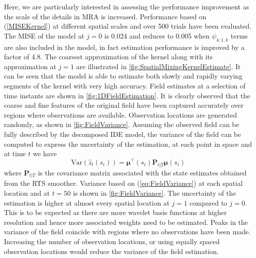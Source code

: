 \documentclass[11pt,draftcls,onecolumn,peerreview]{IEEEtran}
\begin{document}
  Here, we are particularly interested in assessing the performance improvement as the scale of the details in MRA is increased. Performance based on (\ref{MISEKernel}) at different spatial scales and over 500 trials have been evaluated. The MISE of the model at $j=0$ is 0.024 and reduces to 0.005 when $\psi_{4;1,k}$ terms are also included in the model, in fact estimation performance is improved by a factor of 4.8. The coarsest approximation of the kernel along with its approximation at $j=1$ are illustrated in \figurename{\ref{fig:SpatialMixingKernelEstimate}. It can be seen that the model is able to estimate both slowly and rapidly varying segments of the  kernel with very high accuracy.  Field estimates  at a selection of time instants are shown in \figurename{\ref{fig:1DFieldEstimation}}. It is clearly observed that the coarse and fine features of the original field have been captured accurately over regions where observations are available. Observation locations are generated randomly, as shown in \figurename{ \ref{fig:FieldVariance}}. Assuming the observed field can be fully described by the  decomposed IDE model, the variance of the field can be computed to express the  uncertainty of the estimation, at each point in space and at time $t$ we have 
\begin{equation}
 \text{Var}(\hat z_t(s_i))=\boldsymbol\mu^{\top}(s_i) \mathbf P_{t|T}\boldsymbol\mu(s_i)
\label{eq:FieldVariance}
\end{equation}
where $\mathbf P_{t|T} $ is the covariance matrix associated with the  state estimates obtained from the RTS smoother. Variance based on (\ref{eq:FieldVariance}) at each spatial location and at $t=50$ is shown in \figurename{\ref{fig:FieldVariance}}. The uncertainty of the estimation is higher at almost  every spatial location at $j=1$ compared to $j=0$. This is to be expected as there are more wavelet basis functions at higher resolution and hence more associated weights need to be estimated. Peaks in the variance of the field coincide with regions where no observations have been made. Increasing the number of observation locations, or using equally spaced observation locations would reduce the variance of the field estimation.
}
\end{document}
